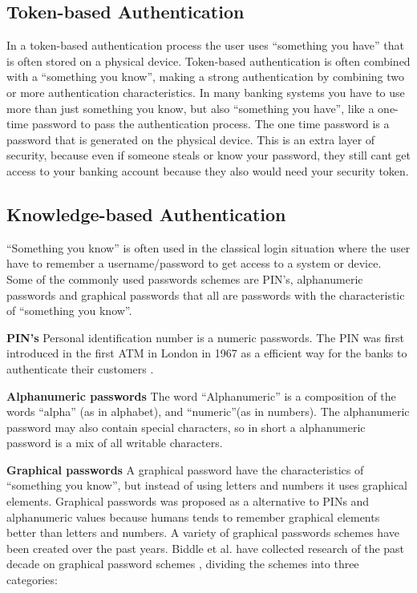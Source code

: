     \subsection{Token-based Authentication}
    In a token-based authentication process the user uses ``something you have'' that is often stored on a physical device. Token-based authentication is often combined with a ``something you know'', making a strong authentication by combining two or more authentication characteristics. In many banking systems you have to use more than just something you know, but also ``something you have'', like a one-time password to pass the authentication process. The one time password is a password that is generated on the physical device. This is an extra layer of security, because even if someone steals or know your password, they still cant get access to your banking account because they also would need your security token.

    

    \subsection{Knowledge-based Authentication}
    ``Something you know'' is often used in the classical login situation where the user have to remember a username/password to get access to a system or device. Some of the commonly used passwords schemes are PIN's, alphanumeric passwords and graphical passwords that all are passwords with the characteristic of ``something you know''.

      {\bf PIN's} Personal identification number is a numeric passwords. The PIN was first introduced in the first ATM in London in 1967 as a efficient way for the banks to authenticate their customers \cite{Bonneau1}.      

      {\bf Alphanumeric passwords}
      The word ``Alphanumeric'' is a composition of the words ``alpha'' (as in alphabet), and ``numeric''(as in numbers). The alphanumeric password may also contain special characters, so in short a alphanumeric password is a mix of all writable characters.

      {\bf Graphical passwords}
      A graphical password have the characteristics of ``something you know'', but instead of using letters and numbers it uses graphical elements. Graphical passwords was proposed as a alternative to PINs and alphanumeric values because humans tends to remember graphical elements better than letters and numbers. A variety of graphical passwords schemes have been created over the past years. Biddle et al. have collected research of the past decade on graphical password schemes \cite{Biddle}, dividing the schemes into three categories: 

